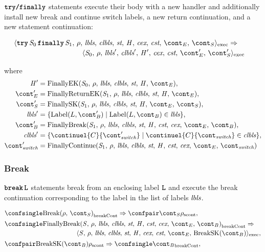 \documentclass[a4paper,oneside,fleqn]{article}
\newcommand{\synt}[1]{\ensuremath{\text{\textbf{\texttt{#1}}}}}
\DeclareMathOperator{\bbreak}{\synt{break}}
\newcommand{\cesktrans}[2]{\ensuremath{{#1} \Rightarrow {#2}}}
\newcommand{\cesktranssplit}[2]{\ensuremath{{#1} \Rightarrow\\ {#2}}}
\begin{document}
$\synt{try/finally}$ statements execute their body with a new handler and additionally install new break and continue switch labels, a new return continuation, and a new statement continuation:

\begin{align*}
    &\begin{multlined}
        \cesktranssplit
            {\execconf{\TryFinally{\stmti{0}}{\stmti{1}}}{\env}{\lbls}{\clbls}{\strace}{\handler}{\cex,\,\cstrace}{\econt}{\scont}}%
            {\execconf{\stmti{0}}{\env}{\lbls'}{\clbls'}{\handler'}{\cex}{\cstrace}{\econt'}{\scont'}}
    \end{multlined}
\end{align*}

\noindent where
\[
\begin{aligned}
    \handler' &= \FinallyK{\stmti{0}},\\
    \econt' &= \FinallyReturnK{\stmti{1}},\\
    \scont' &= \FinallySK{\stmti{1}},\\
    \lbls' &= \lbrace \mathrm{Label}(L, \bcont') \mid \mathrm{Label}(L, \bcont) \in \lbls\rbrace,\\
    \bcont' &= \FinallyBreak{\stmti{1}}{\bcont},\\
    \clbls' &= \lbrace \continuel{C}{\switchcont'} \mid  \continuel{C}{\switchcont} \in \clbls\rbrace,\\
    \switchcont' &= \FinallyContinue{\stmti{1}}{\switchcont}
\end{aligned}
\]


\subsubsection{Break}

$\bbreak \synt{L}$ statements break from an enclosing label $\synt{L}$ and execute the break continuation corresponding to the label in the list of labels $\textit{lbls}$.

\begin{align*}
    &\cesktrans%
        {\breakconf{\Break{\env}{\scont}}}%
        {\scontconf{\scont}{\env}},\\
    &\begin{multlined}
        \cesktranssplit%
            {\breakconf{\FinallyBreak{\stmt}{\bcont}}}%
            {\execconf{\stmt}{\env}{\lbls}{\clbls}{\strace}{\handler}{\cex,\,\cstrace}{\econt}{\mathrm{BreakSK}(\bcont)}},
    \end{multlined}\\
    &\cesktrans%
        {\scontconf{\mathrm{BreakSK}(\bcont)}{\env}}%
        {\breakconf{\bcont}},
\end{align*}
\end{document}
